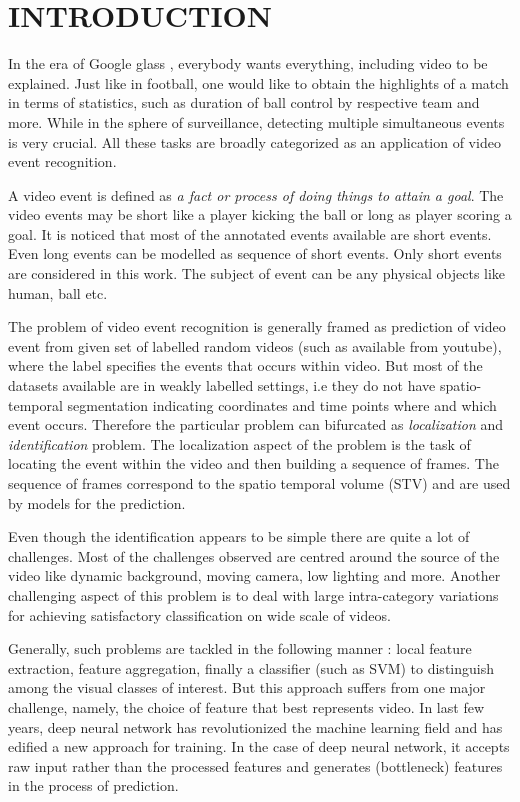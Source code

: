 \chapter{INTRODUCTION}
\label{chap:intro}
In the era of Google glass \citep{googleGlass}, %
everybody wants everything, including video to be explained.  Just like in football, one would like to obtain the highlights of a match in terms of statistics, such as duration of ball control by respective team and more.  While in the sphere of surveillance, detecting multiple simultaneous events is very crucial.  All these tasks are broadly categorized as an application of video event recognition. 

\par A video event is defined as \textit{a fact or process of doing things to attain a goal}.  The video events may be short like a player kicking the ball or long as player scoring a goal.  It is noticed that most of the annotated events available are short events. Even long events can be modelled as sequence of short events.  Only short events are considered in this work. The subject of event can be any physical objects like human, ball etc.
\par The problem of video event recognition is generally framed as prediction of video event from given set of labelled random videos (such as available from youtube), where the label specifies the events that occurs within video.  But most of the datasets available are in weakly labelled settings, i.e they do not have spatio-temporal segmentation indicating coordinates and time points where and which event occurs.  Therefore the particular problem can bifurcated as \textit{localization} and \textit{identification} problem.  The localization aspect of the problem is the task of locating the event within the video %
and then building a sequence of frames.  The sequence of frames correspond to the spatio temporal volume (STV) and are used by models for the prediction.
\par Even though the identification appears to be simple there are quite a lot of challenges.  Most of the challenges observed are centred around the source of the video like dynamic background, moving camera, low lighting and more.  Another challenging aspect of this problem is to deal with large intra-category variations for achieving satisfactory classification on wide scale of videos.
\par Generally, such problems are tackled in the following manner : local feature extraction, feature aggregation, finally a classifier (such as SVM) to distinguish among the visual classes of interest.  But this approach suffers from one major challenge, namely, the choice of feature that best represents video.  In last few years, deep neural network has revolutionized the machine learning field and has edified a new approach for training.  In the case of deep neural network, it accepts raw input rather than the processed features and generates (bottleneck) features in the process of prediction. 
